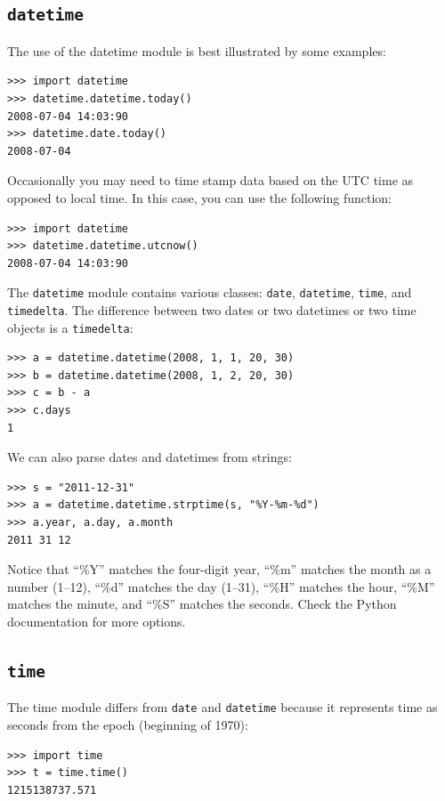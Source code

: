 \documentclass[justified, sixbynine]{tufte-book}
\def\ft{\small\tt}
\theoremstyle{plain}%
\newtheorem * {corollary}{Corollary}
\theoremstyle{definition}
\theoremstyle{remark}
\newtheorem * {remark}{Remark}
\newtheorem * {note}{Note}
\begin{document}
\begin{fullwidth}
\goodbreak\subsection{{\ft datetime}}

  

The use of the datetime module is best illustrated by some examples:
\begin{lstlisting}
>>> import datetime
>>> datetime.datetime.today()
2008-07-04 14:03:90
>>> datetime.date.today()
2008-07-04
\end{lstlisting}

Occasionally you may need to time stamp data based on the UTC time as opposed to local time. In this case, you can use the following function:
\begin{lstlisting}
>>> import datetime
>>> datetime.datetime.utcnow()
2008-07-04 14:03:90
\end{lstlisting}

The {\ft datetime} module contains various classes: {\ft date}, {\ft datetime}, {\ft time}, and {\ft timedelta}. The difference between two dates or two datetimes or two time objects is a {\ft timedelta}:
\begin{lstlisting}
>>> a = datetime.datetime(2008, 1, 1, 20, 30)
>>> b = datetime.datetime(2008, 1, 2, 20, 30)
>>> c = b - a
>>> c.days
1
\end{lstlisting}

We can also parse dates and datetimes from strings:
\begin{lstlisting}
>>> s = "2011-12-31"
>>> a = datetime.datetime.strptime(s, "%Y-%m-%d")
>>> a.year, a.day, a.month
2011 31 12
\end{lstlisting}

Notice that ``\%Y'' matches the four-digit year, ``\%m'' matches the month as a number (1--12), ``\%d'' matches the day (1--31), ``\%H'' matches the hour, ``\%M'' matches the minute, and ``\%S'' matches the seconds. Check the Python documentation for more options.

\goodbreak\subsection{{\ft time}}


The time module differs from {\ft date} and {\ft datetime} because it represents time as seconds from the epoch (beginning of 1970):
\begin{lstlisting}
>>> import time
>>> t = time.time()
1215138737.571
\end{lstlisting}


\end{fullwidth}
\end{document}
